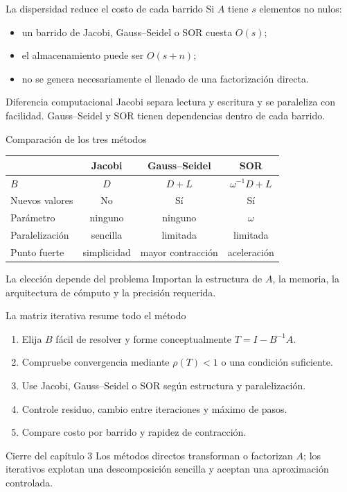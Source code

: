 \documentclass[aspectratio=169,12pt]{beamer}
\begin{document}
\begin{frame}{La dispersidad reduce el costo de cada barrido}
Si $A$ tiene $s$ elementos no nulos:
\begin{itemize}
  \item un barrido de Jacobi, Gauss--Seidel o SOR cuesta $O(s)$;
  \item el almacenamiento puede ser $O(s+n)$;
  \item no se genera necesariamente el llenado de una factorización directa.
\end{itemize}
\begin{block}{Diferencia computacional}
Jacobi separa lectura y escritura y se paraleliza con facilidad.
Gauss--Seidel y SOR tienen dependencias dentro de cada barrido.
\end{block}
\end{frame}

\begin{frame}{Comparación de los tres métodos}
\begin{center}
\begin{tabular}{lccc}
\toprule
 & Jacobi & Gauss--Seidel & SOR\\
\midrule
$B$ & $D$ & $D+L$ & $\omega^{-1}D+L$\\
Nuevos valores & No & Sí & Sí\\
Parámetro & ninguno & ninguno & $\omega$\\
Paralelización & sencilla & limitada & limitada\\
Punto fuerte & simplicidad & mayor contracción & aceleración\\
\bottomrule
\end{tabular}
\end{center}
\begin{block}{La elección depende del problema}
Importan la estructura de $A$, la memoria, la arquitectura de cómputo y la
precisión requerida.
\end{block}
\end{frame}

\begin{frame}{La matriz iterativa resume todo el método}
\begin{enumerate}
  \item Elija $B$ fácil de resolver y forme conceptualmente $T=I-B^{-1}A$.
  \item Compruebe convergencia mediante $\rho(T)<1$ o una condición suficiente.
  \item Use Jacobi, Gauss--Seidel o SOR según estructura y paralelización.
  \item Controle residuo, cambio entre iteraciones y máximo de pasos.
  \item Compare costo por barrido y rapidez de contracción.
\end{enumerate}
\begin{block}{Cierre del capítulo 3}
Los métodos directos transforman o factorizan $A$; los iterativos explotan una
descomposición sencilla y aceptan una aproximación controlada.
\end{block}
\end{frame}
\end{document}
